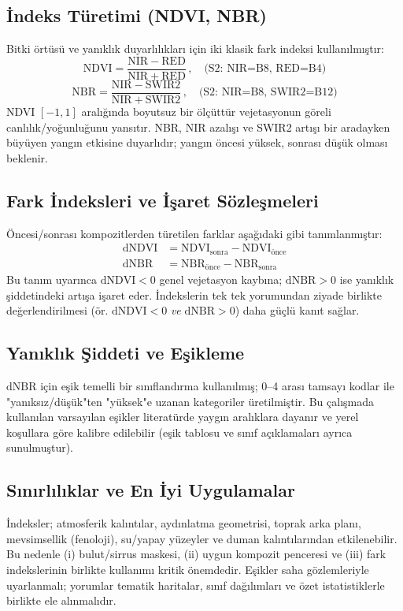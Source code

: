 \documentclass[11pt,a4paper]{article}
\begin{document}
\subsection*{İndeks Türetimi (NDVI, NBR)}
Bitki örtüsü ve yanıklık duyarlılıkları için iki klasik fark indeksi kullanılmıştır:
\begin{equation}
\mathrm{NDVI} = \frac{\mathrm{NIR}-\mathrm{RED}}{\mathrm{NIR}+\mathrm{RED}}\,, \quad \text{(S2: NIR=B8, RED=B4)}
\end{equation}
\begin{equation}
\mathrm{NBR} = \frac{\mathrm{NIR}-\mathrm{SWIR2}}{\mathrm{NIR}+\mathrm{SWIR2}}\,, \quad \text{(S2: NIR=B8, SWIR2=B12)}
\end{equation}
NDVI \([-1,1]\) aralığında boyutsuz bir ölçüttür vejetasyonun göreli canlılık/yoğunluğunu yansıtır. NBR, NIR azalışı ve SWIR2 artışı bir aradayken büyüyen yangın etkisine duyarlıdır; yangın öncesi yüksek, sonrası düşük olması beklenir.

\subsection*{Fark İndeksleri ve İşaret Sözleşmeleri}
Öncesi/sonrası kompozitlerden türetilen farklar aşağıdaki gibi tanımlanmıştır:
\begin{align}
\mathrm{dNDVI} &= \mathrm{NDVI}_{\text{sonra}} - \mathrm{NDVI}_{\text{önce}}\\
\mathrm{dNBR}  &= \mathrm{NBR}_{\text{önce}} - \mathrm{NBR}_{\text{sonra}}
\end{align}
Bu tanım uyarınca \(\mathrm{dNDVI}<0\) genel vejetasyon kaybına; \(\mathrm{dNBR}>0\) ise yanıklık şiddetindeki artışa işaret eder. İndekslerin tek tek yorumundan ziyade birlikte değerlendirilmesi (ör. \(\mathrm{dNDVI}<0\) \emph{ve} \(\mathrm{dNBR}>0\)) daha güçlü kanıt sağlar.

\subsection*{Yanıklık Şiddeti ve Eşikleme}
\(\mathrm{dNBR}\) için eşik temelli bir sınıflandırma kullanılmış; 0--4 arası tamsayı kodlar ile "yanıksız/düşük"ten "yüksek"e uzanan kategoriler üretilmiştir. Bu çalışmada kullanılan varsayılan eşikler literatürde yaygın aralıklara dayanır ve yerel koşullara göre kalibre edilebilir (eşik tablosu ve sınıf açıklamaları ayrıca sunulmuştur).

\subsection*{Sınırlılıklar ve En İyi Uygulamalar}
İndeksler; atmosferik kalıntılar, aydınlatma geometrisi, toprak arka planı, mevsimsellik (fenoloji), su/yapay yüzeyler ve duman kalıntılarından etkilenebilir. Bu nedenle (i) bulut/sirrus maskesi, (ii) uygun kompozit penceresi ve (iii) fark indekslerinin birlikte kullanımı kritik önemdedir. Eşikler saha gözlemleriyle uyarlanmalı; yorumlar tematik haritalar, sınıf dağılımları ve özet istatistiklerle birlikte ele alınmalıdır.
\end{document}
